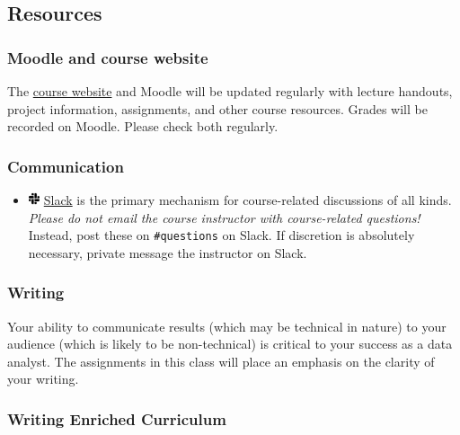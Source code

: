 \documentclass[
  letterpaper,
  DIV=11,
  numbers=noendperiod]{scrartcl}
\providecommand{\tightlist}{%
  \setlength{\itemsep}{0pt}\setlength{\parskip}{0pt}}\usepackage{longtable,booktabs,array}
\begin{document}
\hypertarget{resources}{%
\subsection*{Resources}\label{resources}}

\hypertarget{moodle-and-course-website}{%
\subsubsection{Moodle and course
website}\label{moodle-and-course-website}}

The \href{index.qmd}{course website} and Moodle will be updated
regularly with lecture handouts, project information, assignments, and
other course resources. Grades will be recorded on Moodle. Please check
both regularly.

\hypertarget{communication}{%
\subsubsection{Communication}\label{communication}}

\begin{itemize}
\tightlist
\item
  \includegraphics[width=0.88em,height=1em]{syllabus_files/figure-pdf/fa-icon-4f6d0df4e3bb3843b0bd155ace73ff01.pdf}
  \href{}{Slack} is the primary mechanism for course-related discussions
  of all kinds. \emph{Please do not email the course instructor with
  course-related questions!} Instead, post these on \texttt{\#questions}
  on Slack. If discretion is absolutely necessary, private message the
  instructor on Slack.
\end{itemize}

\hypertarget{writing}{%
\subsubsection{Writing}\label{writing}}

Your ability to communicate results (which may be technical in nature)
to your audience (which is likely to be non-technical) is critical to
your success as a data analyst. The assignments in this class will place
an emphasis on the clarity of your writing.

\hypertarget{writing-enriched-curriculum}{%
\subsubsection{Writing Enriched
Curriculum}\label{writing-enriched-curriculum}}
\end{document}
